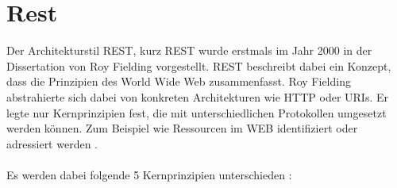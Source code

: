 \chapter{Rest}
\label{sec:rest}
Der Architekturstil \acrlong{REST}, kurz \acrshort{REST} wurde erstmals im Jahr 2000 in der Dissertation von Roy Fielding vorgestellt. REST beschreibt dabei ein Konzept, dass die Prinzipien des World Wide Web zusammenfasst. Roy Fielding abstrahierte sich dabei von konkreten Architekturen wie HTTP oder URIs. Er legte nur Kernprinzipien fest, die mit unterschiedlichen Protokollen umgesetzt werden können. Zum Beispiel wie Ressourcen im WEB identifiziert oder adressiert werden \cite{fielding:restDis}. \\
\\
Es werden dabei folgende 5 Kernprinzipien unterschieden \cite{restHttp:book}: 
